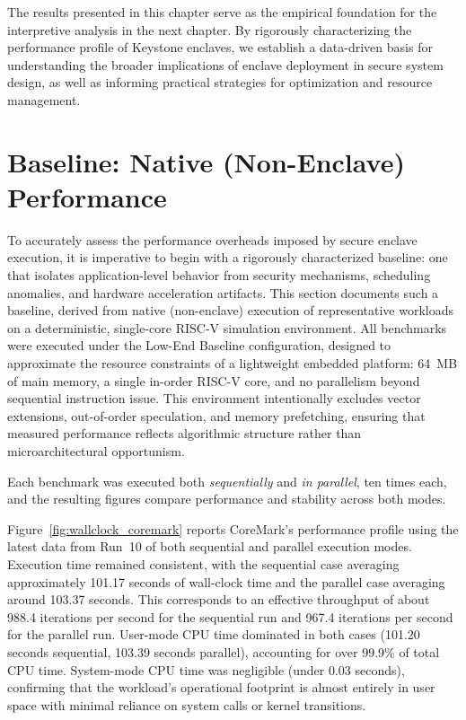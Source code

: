 The results presented in this chapter serve as the empirical foundation for the interpretive analysis in the next chapter. By rigorously characterizing the performance profile of Keystone enclaves, we establish a data-driven basis for understanding the broader implications of enclave deployment in secure system design, as well as informing practical strategies for optimization and resource management.

\section{Baseline: Native (Non-Enclave) Performance}
\label{sec:baseline-native}

To accurately assess the performance overheads imposed by secure enclave execution, it is imperative to begin with a rigorously characterized baseline: one that isolates application-level behavior from security mechanisms, scheduling anomalies, and hardware acceleration artifacts. This section documents such a baseline, derived from native (non-enclave) execution of representative workloads on a deterministic, single-core RISC-V simulation environment. All benchmarks were executed under the Low-End Baseline configuration, designed to approximate the resource constraints of a lightweight embedded platform: 64~MB of main memory, a single in-order RISC-V core, and no parallelism beyond sequential instruction issue. This environment intentionally excludes vector extensions, out-of-order speculation, and memory prefetching, ensuring that measured performance reflects algorithmic structure rather than microarchitectural opportunism.

Each benchmark was executed both \emph{sequentially} and \emph{in parallel}, ten times each, and the resulting figures compare performance and stability across both modes.

Figure~\ref{fig:wallclock_coremark} reports CoreMark's performance profile using the latest data from Run~10 of both sequential and parallel execution modes. Execution time remained consistent, with the sequential case averaging approximately 101.17 seconds of wall-clock time and the parallel case averaging around 103.37 seconds. This corresponds to an effective throughput of about 988.4 iterations per second for the sequential run and 967.4 iterations per second for the parallel run. User-mode CPU time dominated in both cases (101.20 seconds sequential, 103.39 seconds parallel), accounting for over 99.9\% of total CPU time. System-mode CPU time was negligible (under 0.03 seconds), confirming that the workload’s operational footprint is almost entirely in user space with minimal reliance on system calls or kernel transitions.

